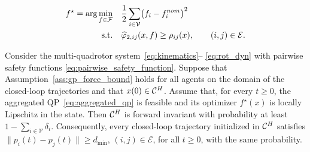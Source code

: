 \documentclass[10pt,a4paper]{amsart}
\begin{document}
\begin{align}
    f^\star
    =
    \arg\min_{f\in\mathcal F}
    \quad&
    \frac{1}{2}
    \sum_{i\in\mathcal V}
    \bigl(f_i-f_i^{\rm nom}\bigr)^2
    \label{eq:aggregated_qp}
    \\
    \text{s.t.}\quad&
    \widehat\varphi_{2,ij}(x,f)
    \geq
    \rho_{ij}(x),
    \qquad
    (i,j)\in\mathcal E .
    \nonumber
\end{align}

\begin{theorem}
\label{thm:probabilistic_safety}
Consider the multi-quadrotor system~\eqref{eq:kinematics}--%
\eqref{eq:rot_dyn} with pairwise safety functions
\eqref{eq:pairwise_safety_function}. Suppose that
Assumption~\ref{ass:gp_force_bound} holds for all agents on
the domain of the closed-loop trajectories and that
$x(0)\in\mathcal C^{\rm H}$. Assume that, for every
$t\geq0$, the aggregated QP~\eqref{eq:aggregated_qp} is
feasible and its optimizer $f^\star(x)$ is locally Lipschitz
in the state. Then $\mathcal C^{\rm H}$ is forward invariant
with probability at least $1-\sum_{i\in\mathcal V}\delta_i$. Consequently, every closed-loop trajectory initialized in
$\mathcal C^{\rm H}$ satisfies $\|p_i(t)-p_j(t)\|\geq d_{\min}$, $(i,j)\in\mathcal E$,
for all $t\geq0$, with the same probability.
\end{theorem}
\end{document}
